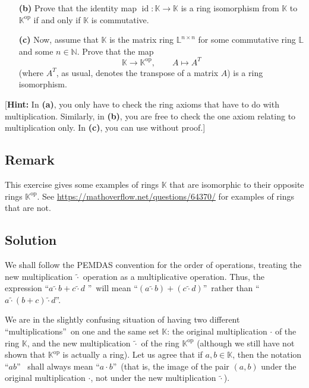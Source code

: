 \documentclass[paper=a4, fontsize=12pt]{scrartcl}%
\theoremstyle{plainsl}
\theoremstyle{definition}
\theoremstyle{remark}
\begin{document}
\begin{enumerate}
\item[\textbf{(b)}] Prove that the identity map $\operatorname{id} :
\mathbb{K} \to\mathbb{K}$ is a ring isomorphism from $\mathbb{K}$ to
$\mathbb{K}^{\operatorname{op}}$ if and only if $\mathbb{K}$ is commutative.

\item[\textbf{(c)}] Now, assume that $\mathbb{K}$ is the matrix ring
$\mathbb{L}^{n \times n}$ for some commutative ring $\mathbb{L}$ and some $n
\in\mathbb{N}$. Prove that the map
\[
\mathbb{K} \to\mathbb{K}^{\operatorname{op}}, \qquad A \mapsto A^{T}
\]
(where $A^{T}$, as usual, denotes the transpose of a matrix $A$) is a ring isomorphism.
\end{enumerate}

[\textbf{Hint:} In \textbf{(a)}, you only have to check the ring axioms that
have to do with multiplication. Similarly, in \textbf{(b)}, you are free to
check the one axiom relating to multiplication only. In \textbf{(c)}, you can
use \cite[Exercise 6.5]{detnotes} without proof.]

\subsection{Remark}

This exercise gives some examples of rings $\mathbb{K}$ that are isomorphic to
their opposite rings $\mathbb{K}^{\operatorname{op}}$. See
\url{https://mathoverflow.net/questions/64370/} for examples of rings that are not.

\subsection{Solution}

We shall follow the PEMDAS convention for the order of operations, treating
the new multiplication $\left.  \widetilde{\cdot}\right.  $ operation as a
multiplicative operation. Thus, the expression \textquotedblleft$a\left.
\widetilde{\cdot}\right.  b+c\left.  \widetilde{\cdot}\right.  d$%
\textquotedblright\ will mean \textquotedblleft$\left(  a\left.
\widetilde{\cdot}\right.  b\right)  +\left(  c\left.  \widetilde{\cdot
}\right.  d\right)  $\textquotedblright\ rather than \textquotedblleft%
$a\left.  \widetilde{\cdot}\right.  \left(  b+c\right)  \left.
\widetilde{\cdot}\right.  d$\textquotedblright.

We are in the slightly confusing situation of having two different
\textquotedblleft multiplications\textquotedblright\ on one and the same set
$\mathbb{K}$: the original multiplication $\cdot$ of the ring $\mathbb{K}$,
and the new multiplication $\left.  \widetilde{\cdot}\right.  $ of the ring
$\mathbb{K}^{\operatorname*{op}}$ (although we still have not shown that
$\mathbb{K}^{\operatorname*{op}}$ is actually a ring). Let us agree that if
$a,b\in\mathbb{K}$, then the notation \textquotedblleft$ab$\textquotedblright%
\ shall always mean \textquotedblleft$a\cdot b$\textquotedblright\ (that is,
the image of the pair $\left(  a,b\right)  $ under the original multiplication
$\cdot$, not under the new multiplication $\left.  \widetilde{\cdot}\right.  $).
\end{document}
